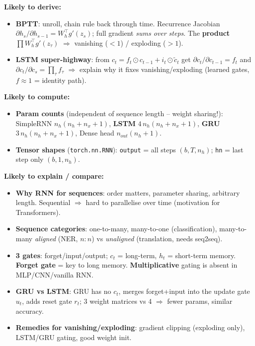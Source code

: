 \documentclass[10pt,a4paper]{article}
\begin{document}
	\begin{examtipbox}
		\textbf{Likely to derive:}
		\begin{itemize}[leftmargin=*, nosep]
			\item \textbf{BPTT}: unroll, chain rule back through time. Recurrence Jacobian $\partial h_s/\partial h_{s-1}=W_h^\top g'(z_s)$; full gradient \emph{sums over steps}. The \textbf{product} $\prod W_h^\top g'(z_\tau)$ $\Rightarrow$ vanishing ($<1$) / exploding ($>1$).
			\item \textbf{LSTM super-highway}: from $c_t=f_t\odot c_{t-1}+i_t\odot\tilde c_t$ get $\partial c_t/\partial c_{t-1}=f_t$ and $\partial c_t/\partial c_s=\prod_\tau f_\tau$ $\Rightarrow$ explain why it fixes vanishing/exploding (learned gates, $f\!\approx\!1$ = identity path).
		\end{itemize}
		\textbf{Likely to compute:}
		\begin{itemize}[leftmargin=*, nosep]
			\item \textbf{Param counts} (independent of sequence length -- weight sharing!): SimpleRNN $n_h(n_h{+}n_x{+}1)$, \textbf{LSTM} $4\,n_h(n_h{+}n_x{+}1)$, \textbf{GRU} $3\,n_h(n_h{+}n_x{+}1)$, Dense head $n_{out}(n_h{+}1)$.
			\item \textbf{Tensor shapes} (\texttt{torch.nn.RNN}): \texttt{output} = all steps $(b,T,n_h)$; \texttt{hn} = last step only $(b,1,n_h)$.
		\end{itemize}
		\textbf{Likely to explain / compare:}
		\begin{itemize}[leftmargin=*, nosep]
			\item \textbf{Why RNN for sequences}: order matters, parameter sharing, arbitrary length. Sequential $\Rightarrow$ hard to parallelise over time (motivation for Transformers).
			\item \textbf{Sequence categories}: one-to-many, many-to-one (classification), many-to-many \emph{aligned} (NER, $n{:}n$) vs \emph{unaligned} (translation, needs seq2seq).
			\item \textbf{3 gates}: forget/input/output; $c_t$ = long-term, $h_t$ = short-term memory. \textbf{Forget gate} = key to long memory. \textbf{Multiplicative} gating is absent in MLP/CNN/vanilla RNN.
			\item \textbf{GRU vs LSTM}: GRU has no $c_t$, merges forget+input into the update gate $u_t$, adds reset gate $r_t$; 3 weight matrices vs 4 $\Rightarrow$ fewer params, similar accuracy.
			\item \textbf{Remedies for vanishing/exploding}: gradient clipping (exploding only), LSTM/GRU gating, good weight init.

\end{itemize}
\end{examtipbox}
\end{document}

